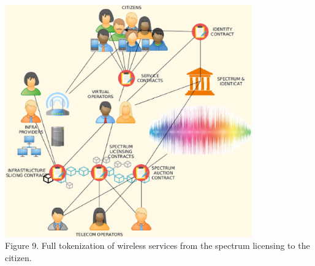 \documentclass[12pt]{amsart}
\begin{document}
\begin{center}
  \includegraphics[keepaspectratio, width=0.8\textwidth]{images/bc5g/beyond-y.eps}
\\
Figure 9. Full tokenization of wireless services from
the spectrum licensing to the citizen.
\\
\end{center}
\end{document}
